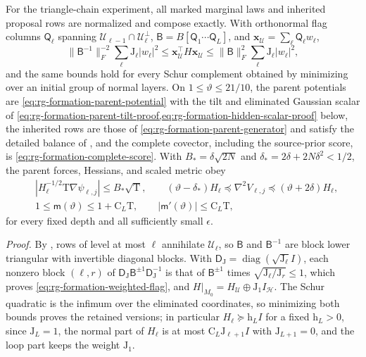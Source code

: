 For the triangle-chain experiment, all marked marginal laws and inherited
proposal rows are normalized and compose exactly. With orthonormal flag
columns \(\mathsf Q_\ell\) spanning \(\mathcal U_{\ell-1}\cap\mathcal U_\ell^\perp\),
\(\mathsf B=B[\mathsf Q_1\cdots\mathsf Q_L]\), and
\(\mathbf x_{\mathcal U}=\sum_\ell\mathsf Q_\ell w_\ell\),
\begin{equation}
\|\mathsf B^{-1}\|_F^{-2}\sum_\ell\mathrm J_\ell|w_\ell|^2
\le \mathbf x_{\mathcal U}^{\top}H\mathbf x_{\mathcal U}
\le\|\mathsf B\|_F^2\sum_\ell\mathrm J_\ell|w_\ell|^2,
\label{eq:rg-formation-weighted-flag}
\end{equation}
and the same bounds hold for every Schur complement obtained by minimizing over
an initial group of normal layers. On \(1\le\vartheta\le21/10\), the parent
potentials are \cref{eq:rg-formation-parent-potential} with the tilt and
eliminated Gaussian scalar of
\cref{eq:rg-formation-parent-tilt-proof,eq:rg-formation-hidden-scalar-proof}
below, the inherited rows are those of \cref{eq:rg-formation-parent-generator}
and satisfy the detailed balance of ,
and the complete covector, including the source-prior score, is
\cref{eq:rg-formation-complete-score}. With \(B_*=\delta\sqrt{2N}\) and
\(\delta_*=2\delta+2N\delta^2<1/2\), the parent forces, Hessians, and scaled
metric obey
\begin{align}
 &|H_\ell^{-1/2}\mathrm T\nabla\psi_{\ell,j}|\le B_*\sqrt{\mathrm T},
 \qquad
 (\vartheta-\delta_*)H_\ell
 \preceq\nabla^2V_{\ell,j}
 \preceq(\vartheta+2\delta)H_\ell,
 \label{eq:rg-formation-parent-relative-bounds}\\
 &1\le\mathsf m(\vartheta)\le1+\mathrm C_L\mathrm T,\qquad
 |\mathsf m'(\vartheta)|\le\mathrm C_L\mathrm T,
 \label{eq:rg-formation-metric-bounds-proof}
\end{align}
for every fixed depth and all sufficiently small \(\epsilon\).

\noindent\emph{Proof.}
By , rows of level at most \(\ell\) annihilate
\(\mathcal U_\ell\), so \(\mathsf B\) and \(\mathsf B^{-1}\) are block lower
triangular with invertible diagonal blocks. With
\(\mathsf D_{\mathrm J}=\operatorname{diag}(\sqrt{\mathrm J_\ell}I)\), each
nonzero block \((\ell,r)\) of
\(\mathsf D_{\mathrm J}\mathsf B^{\pm1}\mathsf D_{\mathrm J}^{-1}\) is that of
\(\mathsf B^{\pm1}\) times \(\sqrt{\mathrm J_\ell/\mathrm J_r}\le1\), which
proves \cref{eq:rg-formation-weighted-flag}, and \(H|_{M_0}=H_{\mathcal U}\oplus
\mathrm J_1I_{\mathcal H}\). The Schur quadratic is the infimum over the
eliminated coordinates, so minimizing both bounds proves the retained
versions; in particular \(H_\ell\succeq\mathrm h_LI\) for a fixed
\(\mathrm h_L>0\), since \(\mathrm J_L=1\), the normal part of \(H_\ell\) is at
most \(\mathrm C_L\mathrm J_{\ell+1}I\) with \(\mathrm J_{L+1}=0\), and the loop
part keeps the weight \(\mathrm J_1\).

